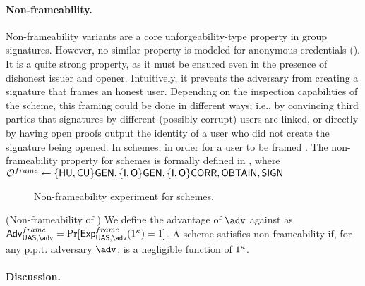 \paragraph{Non-frameability.} %
Non-frameability variants are a core unforgeability-type property in group
signatures. However, no
similar property is modeled for anonymous credentials (). It is a quite strong
property, as it must be ensured even in the presence of dishonest issuer and
opener. Intuitively, it prevents the adversary from creating a signature that
frames an honest user. Depending on the inspection capabilities of the scheme,
this framing could be done in different ways; i.e., by convincing third parties
that signatures by different (possibly corrupt) users are linked, or directly
by having open proofs output the identity of a user who did not create the
signature being opened.
%
In \UAS schemes, in order for a user to be framed . The
non-frameability property for \UAS schemes is formally defined in
, where $\mathcal{O}^{frame} \gets \lbrace\mathsf{HU},\mathsf{CU}\rbrace\mathsf{GEN},
\lbrace\mathsf{I},\mathsf{O}\rbrace\mathsf{GEN},\lbrace\mathsf{I},\mathsf{O}\rbrace\mathsf{CORR},\mathsf{OBTAIN},\mathsf{SIGN}$

\begin{figure}[htp!]
  \caption{Non-frameability experiment for \UAS schemes.}
  \label{fig:exp-uas-frame}
\end{figure}

\begin{definition}{(Non-frameability of \GSAC)}
  We define the advantage \AdvNonframe of $\adv$ against \ExpNonframe as
  $\AdvNonframe=\Pr\lbrack\ExpNonframe(1^\secpar)=1\rbrack$.
  A \GSAC scheme satisfies non-frameability if, for any p.p.t. adversary $\adv$,
  \AdvNonframe is a negligible function of $1^\kappa$.
\end{definition}

\paragraph{Discussion.} %

